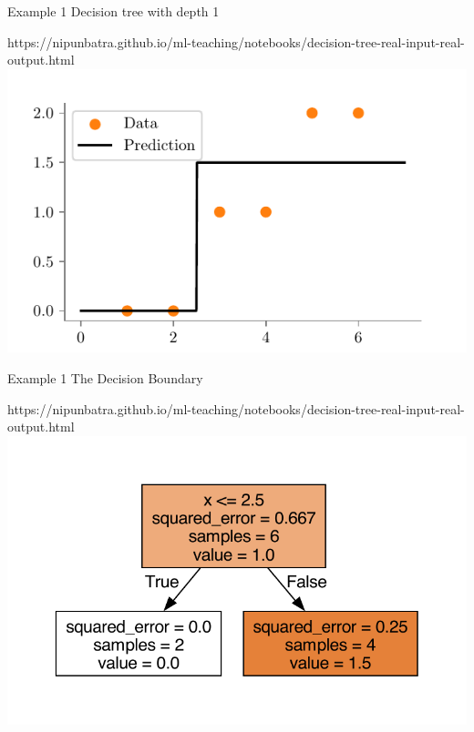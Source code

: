 \documentclass[usenames,dvipsnames]{beamer}
\begin{document}
\begin{frame}{Example 1}
Decision tree with depth 1
\begin{center}
	\begin{notebookbox}{https://nipunbatra.github.io/ml-teaching/notebooks/decision-tree-real-input-real-output.html}
		\includegraphics{../assets/decision-trees/figures/ri-ro-depth-1.pdf}
	\end{notebookbox}	
\end{center}
\end{frame}

\begin{frame}{Example 1}
The Decision Boundary
\begin{center}
	\begin{notebookbox}{https://nipunbatra.github.io/ml-teaching/notebooks/decision-tree-real-input-real-output.html}
		\includegraphics[scale=0.6]{../assets/decision-trees/figures/ri-ro-depth-1-sklearn.pdf}
	\end{notebookbox}
\end{center}
\end{frame}
\end{document}
